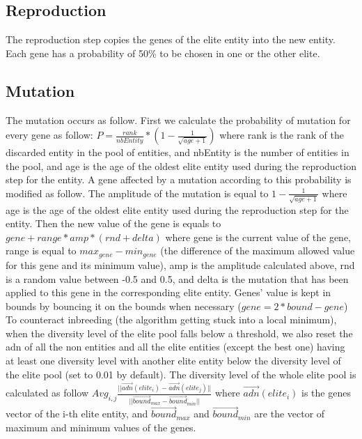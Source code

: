 \subsection{Reproduction}

The reproduction step copies the genes of the elite entity into the new entity. Each gene has a probability of 50\% to be chosen in one or the other elite.\\

\subsection{Mutation}

The mutation occurs as follow. First we calculate the probability of mutation for every gene as follow: $P=\frac{rank}{nbEntity}*(1-\frac{1}{\sqrt{age+1}})$ where rank is the rank of the discarded entity in the pool of entities, and nbEntity is the number of entities in the pool, and age is the age of the oldest elite entity used during the reproduction step for the entity. A gene affected by a mutation according to this probability is modified as follow. The amplitude of the mutation is equal to $1-\frac{1}{\sqrt{age+1}}$ where age is the age of the oldest elite entity used during the reproduction step for the entity. Then the new value of the gene is equals to $gene+range*amp*(rnd+delta)$ where gene is the current value of the gene, range is equal to $max_{gene}-min_{gene}$ (the difference of the maximum allowed value for this gene and its minimum value), amp is the amplitude calculated above, rnd is a random value between -0.5 and 0.5, and delta is the mutation that has been applied to this gene in the corresponding elite entity. Genes' value is kept in bounds by bouncing it on the bounds when necessary ($gene=2*bound-gene$)\\

To counteract inbreeding (the algorithm getting stuck into a local minimum), when the diversity level of the elite pool falls below a threshold, we also reset the adn of all the non entities and all the elite entities (except the best one) having at least one diversity level with another elite entity below the diversity level of the elite pool (set to 0.01 by default). The diversity level of the whole elite pool is calculated as follow $Avg_{i,j}\frac{||\overrightarrow{adn}(elite_i)-\overrightarrow{adn}(elite_j)||}{||\overrightarrow{bound}_{max}-\overrightarrow{bound}_{min}||}$ where $\overrightarrow{adn}(elite_i)$ is the genes vector of the i-th elite entity, and $\overrightarrow{bound}_{max}$ and $\overrightarrow{bound}_{min}$ are the vector of maximum and minimum values of the genes.\\ 

